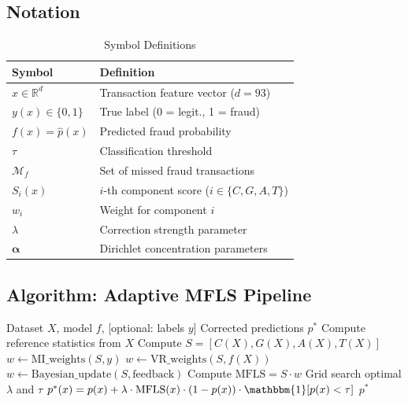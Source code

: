 \documentclass[journal]{IEEEtran}
\newcommand{\MFLS}{\mathrm{MFLS}}
\newcommand{\R}{\mathbb{R}}
\newcommand{\ind}{\mathbbm{1}}
\begin{document}
\subsection{Notation}

\begin{table}[!t]
\centering
\caption{Symbol Definitions}
\label{tab:notation}
\begin{tabular}{@{}ll@{}}
\toprule
\textbf{Symbol} & \textbf{Definition} \\
\midrule
$x \in \R^d$ & Transaction feature vector ($d = 93$) \\
$y(x) \in \{0, 1\}$ & True label (0 = legit., 1 = fraud) \\
$f(x) = \hat{p}(x)$ & Predicted fraud probability \\
$\tau$ & Classification threshold \\
$\mathcal{M}_f$ & Set of missed fraud transactions \\
$S_i(x)$ & $i$-th component score ($i \in \{C,G,A,T\}$) \\
$w_i$ & Weight for component $i$ \\
$\lambda$ & Correction strength parameter \\
$\bm{\alpha}$ & Dirichlet concentration parameters \\
\bottomrule
\end{tabular}
\end{table}

\subsection{Algorithm: Adaptive MFLS Pipeline}

\begin{algorithm}[!t]
\caption{Adaptive MFLS Pipeline}
\label{alg:mfls}
\begin{algorithmic}[1]
\REQUIRE Dataset $X$, model $f$, [optional: labels $y$]
\ENSURE Corrected predictions $p^*$
\STATE Compute reference statistics from $X$
\STATE Compute $S = [C(X), G(X), A(X), T(X)]$
  \STATE $w \leftarrow \text{MI\_weights}(S, y)$
  \STATE $w \leftarrow \text{VR\_weights}(S, f(X))$
\ELSE
  \STATE $w \leftarrow \text{Bayesian\_update}(S, \text{feedback})$
\ENDIF
\STATE Compute $\MFLS = S \cdot w$
\STATE Grid search optimal $\lambda$ and $\tau$
\STATE $p^*(x) = p(x) + \lambda \cdot \MFLS(x) \cdot (1-p(x)) \cdot \ind[p(x) < \tau]$
\RETURN $p^*$
\end{algorithmic}
\end{algorithm}
\end{document}
